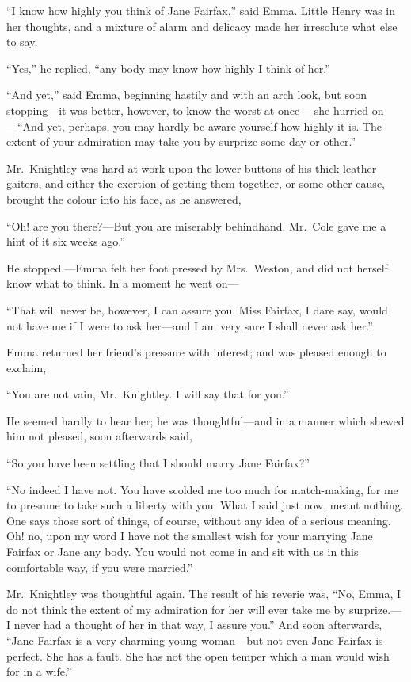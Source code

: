 ``I know how highly you think of Jane Fairfax,'' said Emma.
Little Henry was in her thoughts, and a mixture of alarm and delicacy
made her irresolute what else to say.

``Yes,'' he replied, ``any body may know how highly I think of her.''

``And yet,'' said Emma, beginning hastily and with an arch look,
but soon stopping---it was better, however, to know the worst at once---%
she hurried on---``And yet, perhaps, you may hardly be aware yourself
how highly it is.  The extent of your admiration may take you by
surprize some day or other.''

Mr.\ Knightley was hard at work upon the lower buttons of his thick
leather gaiters, and either the exertion of getting them together,
or some other cause, brought the colour into his face, as he answered,

``Oh! are you there?---But you are miserably behindhand.  Mr.\ Cole
gave me a hint of it six weeks ago.''

He stopped.---Emma felt her foot pressed by Mrs.\ Weston, and did
not herself know what to think.  In a moment he went on---%

``That will never be, however, I can assure you.  Miss Fairfax,
I dare say, would not have me if I were to ask her---and I am very
sure I shall never ask her.''

Emma returned her friend's pressure with interest; and was pleased
enough to exclaim,

``You are not vain, Mr.\ Knightley.  I will say that for you.''

He seemed hardly to hear her; he was thoughtful---and in a manner
which shewed him not pleased, soon afterwards said,

``So you have been settling that I should marry Jane Fairfax?''

``No indeed I have not.  You have scolded me too much for match-making,
for me to presume to take such a liberty with you.  What I said
just now, meant nothing.  One says those sort of things, of course,
without any idea of a serious meaning.  Oh! no, upon my word I have not
the smallest wish for your marrying Jane Fairfax or Jane any body.
You would not come in and sit with us in this comfortable way,
if you were married.''

Mr.\ Knightley was thoughtful again.  The result of his reverie was,
``No, Emma, I do not think the extent of my admiration for her will
ever take me by surprize.---I never had a thought of her in that way,
I assure you.''  And soon afterwards, ``Jane Fairfax is a very charming
young woman---but not even Jane Fairfax is perfect.  She has a fault.
She has not the open temper which a man would wish for in a wife.''


